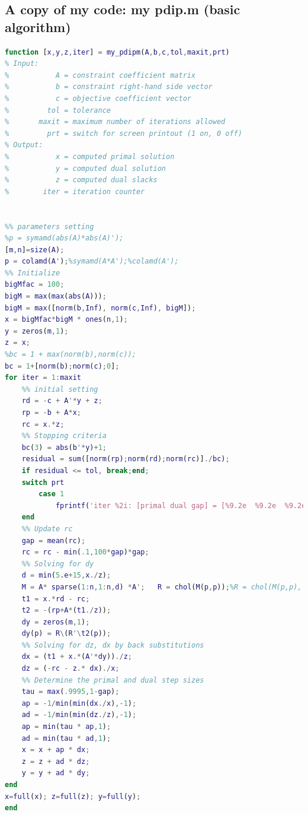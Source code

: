 \subsection*{A copy of my code: my pdip.m (basic algorithm)}
\begin{lstlisting}[language=matlab]
function [x,y,z,iter] = my_pdipm(A,b,c,tol,maxit,prt)
% Input:
%           A = constraint coefficient matrix
%           b = constraint right-hand side vector
%           c = objective coefficient vector
%         tol = tolerance
%       maxit = maximum number of iterations allowed
%         prt = switch for screen printout (1 on, 0 off)
% Output:
%           x = computed primal solution
%           y = computed dual solution
%           z = computed dual slacks
%        iter = iteration counter


%% parameters setting
%p = symamd(abs(A)*abs(A)');     
[m,n]=size(A);
p = colamd(A');%symamd(A*A');%colamd(A');
%% Initialize
bigMfac = 100;
bigM = max(max(abs(A)));
bigM = max([norm(b,Inf), norm(c,Inf), bigM]);
x = bigMfac*bigM * ones(n,1);    
y = zeros(m,1);     
z = x;
%bc = 1 + max(norm(b),norm(c));
bc = 1+[norm(b);norm(c);0];
for iter = 1:maxit
    %% initial setting
    rd = -c + A'*y + z;
    rp = -b + A*x;
    rc = x.*z;
    %% Stopping criteria
    bc(3) = abs(b'*y)+1;
    residual = sum([norm(rp);norm(rd);norm(rc)]./bc);
    if residual <= tol, break;end;
    switch prt
        case 1
            fprintf('iter %2i: [primal dual gap] = [%9.2e  %9.2e  %9.2e]\n',iter,norm([rd;rp;rc])./bc);
    end
    %% Update rc
    gap = mean(rc);
    rc = rc - min(.1,100*gap)*gap;
    %% Solving for dy
    d = min(5.e+15,x./z);
    M = A* sparse(1:n,1:n,d) *A';   R = chol(M(p,p));%R = chol(M(p,p),'lower','vector');
    t1 = x.*rd - rc;
    t2 = -(rp+A*(t1./z));
    dy = zeros(m,1);
    dy(p) = R\(R'\t2(p));
    %% Solving for dz, dx by back substitutions
    dx = (t1 + x.*(A'*dy))./z;
    dz = (-rc - z.* dx)./x;
    %% Determine the primal and dual step sizes
    tau = max(.9995,1-gap);
    ap = -1/min(min(dx./x),-1);
    ad = -1/min(min(dz./z),-1);
    ap = min(tau * ap,1);
    ad = min(tau * ad,1);
    x = x + ap * dx;
    z = z + ad * dz;
    y = y + ad * dy;
end
x=full(x); z=full(z); y=full(y);
end
\end{lstlisting}
\clearpage
